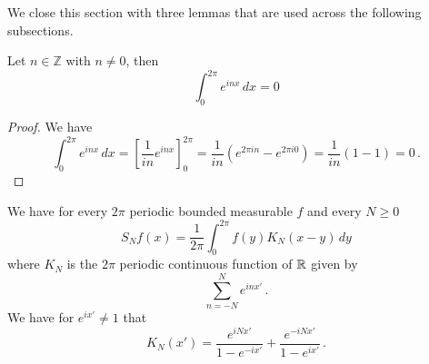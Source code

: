 {\begin{lemma}
\end{lemma}






We close this section with three lemmas that are used
across the following subsections.

\begin{lemma}\label{lem expintegral}
Let $n\in \mathbb{Z}$ with   $n\neq 0$, then
\begin{equation}
\int_0^{2\pi} e^{inx}\, dx=0
\end{equation}
\end{lemma}
\begin{proof}
We have
\begin{equation}
\int_0^{2\pi} e^{inx}\, dx=\left[ \frac 1{in}e^{inx}\right]_0^{2\pi}=\frac  1{in}(e^{2\pi i n}-e^{2\pi i 0})=\frac 1{in}(1-1)=0\, .
\end{equation}

\end{proof}

\begin{lemma}\label{dirichlet}
We have for every $2\pi$ periodic bounded measurable $f$ and every $N\ge 0$
\begin{equation}
    S_Nf(x)=\frac 1{2\pi}\int_{0}^{2\pi}f(y) K_N(x-y)\, dy
\end{equation}
where $K_N$ is the $2\pi$ periodic continuous function of
$\mathbb{R}$ given by
\begin{equation}\label{eqksumexp}
\sum_{n=-N}^N e^{in x'}\, .
\end{equation}
We have for $e^{ix'}\neq 1$ that
\begin{equation}\label{eqksumhil}
    K_N(x')=\frac{e^{iNx'}}{1-e^{-ix'}}
      +\frac {e^{-iNx'}}{1-e^{ix'}} \, .
\end{equation}


\end{lemma}


}
